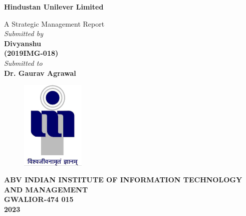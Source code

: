 \title{}
\author{}
\thispagestyle{empty}

\begin{titlepage}
\begin{center}
{\LARGE \bf Hindustan Unilever Limited} \\
\end{center}
\begin{center}
\vspace{0.6in}
{\LARGE A Strategic Management Report} \\
\vspace{0.6in}
{\large \it Submitted by\\\vspace{0.1in}}
{\large \bf \vspace{0.2in}Divyanshu\\(2019IMG-018)\\}
\vspace{0.6in}
{\large \it Submitted to\\}
\vspace{0.1in}
{\large \bf Dr. Gaurav Agrawal}\\
\end {center}
\vspace{0.5in}
\begin{figure}[h]
\centerline{\includegraphics[width=1.2in]{./iiitm}}
\end{figure}
\begin{center}
{\Large \bf ABV INDIAN INSTITUTE OF INFORMATION TECHNOLOGY AND MANAGEMENT\\
GWALIOR-474 015\\}
\vspace{0.2in}
{\Large \bf 2023\\}
\end{center}
\end{titlepage}

